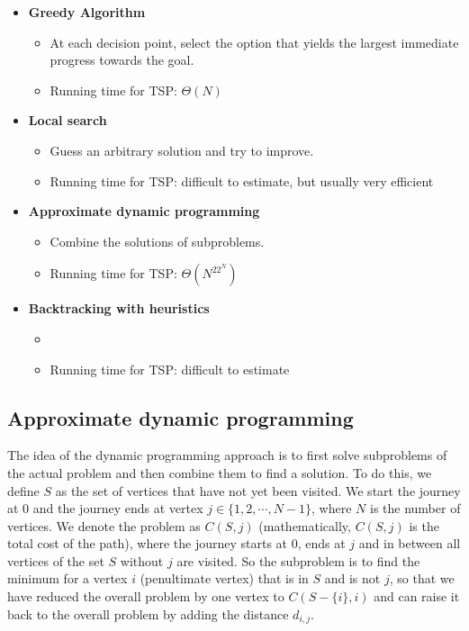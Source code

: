 \begin{itemize}
    \item \textbf{Greedy Algorithm}
    \begin{itemize}
        \item At each decision point, select the option that yields the largest immediate progress towards the goal.
        \item Running time for TSP: $\Theta(N)$
    \end{itemize}
    \item \textbf{Local search}
    \begin{itemize}
        \item Guess an arbitrary solution and try to improve.
        \item Running time for TSP: difficult to estimate, but usually very efficient
    \end{itemize}
    \item \textbf{Approximate dynamic programming}
    \begin{itemize}
        \item Combine the solutions of subproblems.
        \item Running time for TSP: $\Theta(N^22^N)$
    \end{itemize}
    \item \textbf{Backtracking with heuristics}
    \begin{itemize}
        \item 
        \item Running time for TSP: difficult to estimate
    \end{itemize}
\end{itemize}

\subsection{Approximate dynamic programming}

The idea of the dynamic programming approach is to first solve subproblems of the actual problem and then combine them to find a solution. To do this, we define $S$ as the set of vertices that have not yet been visited. We start the journey at 0 and the journey ends at vertex $j\in\{1,2,\cdots,N-1\}$, where $N$ is the number of vertices. We denote the problem as $C(S,j)$ (mathematically, $C(S,j)$ is the total cost of the path), where the journey starts at 0, ends at $j$ and in between all vertices of the set $S$ without $j$ are visited. So the subproblem is to find the minimum for a vertex $i$ (penultimate vertex) that is in $S$ and is not $j$, so that we have reduced the overall problem by one vertex to $C(S-\{i\},i)$ and can raise it back to the overall problem by adding the distance $d_{i,j}$.

